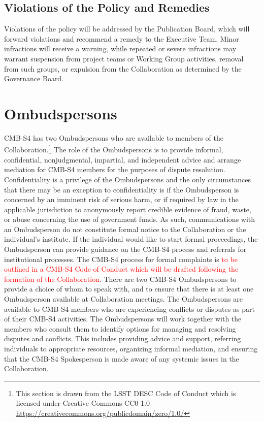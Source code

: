 \documentclass[12pt]{article}
\begin{document}
\subsection{Violations of the Policy and Remedies}
Violations of the policy will be addressed by the Publication Board, which will forward violations and recommend a remedy to the Executive Team.  Minor infractions will receive a warning, while repeated or severe infractions may warrant suspension from project teams or Working Group activities, removal from such groups, or expulsion from the Collaboration as determined by the Governance Board.


\section{Ombudspersons}

CMB-S4 has two Ombudspersons who are available to members of the Collaboration.\footnote{This section is drawn from the LSST DESC Code of Conduct which is licensed under Creative Commons CC0 1.0 \url{https://creativecommons.org/publicdomain/zero/1.0/}} The role of the Ombudspersons is to provide informal, confidential, nonjudgmental, impartial, and independent advice and arrange mediation for CMB-S4 members for the purposes of dispute resolution. Confidentiality is a privilege of the Ombudspersons and the only circumstances that there may be an exception to confidentiality is if the Ombudsperson is concerned by an imminent risk of serious harm, or if required by law in the applicable jurisdiction to anonymously report credible evidence of fraud, waste, or abuse concerning the use of government funds. As such, communications with an Ombudsperson do not constitute formal notice to the Collaboration or the individual's institute. If the individual would like to start formal proceedings, the Ombudsperson can provide guidance on the CMB-S4 process and referrals for institutional processes. The CMB-S4 process for formal complaints is  \textcolor{red}{to be outlined in a CMB-S4 Code of Conduct which will be drafted following the formation of the Collaboration}. There are two CMB-S4 Ombudspersons to provide a choice of whom to speak with, and to ensure that there is at least one Ombudsperson available at Collaboration meetings. The Ombudspersons are available to CMB-S4 members who are experiencing conflicts or disputes as part of their CMB-S4 activities. The Ombudspersons will work together with the members who consult them to identify options for managing and resolving disputes and conflicts. This includes providing advice and support, referring individuals to appropriate resources, organizing informal mediation, and ensuring that the CMB-S4 Spokesperson is made aware of any systemic issues in the Collaboration. 
\end{document}
